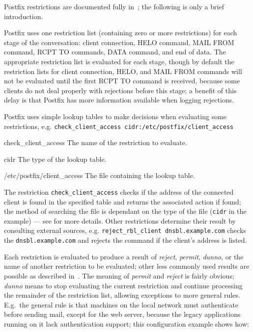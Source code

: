 \label{Mixing and matching Postfix restrictions}

Postfix restrictions are documented fully in~\cite{smtpd_access_readme,
smtpd_per_user_control, policy-servers}; the following is only a brief
introduction.

Postfix uses one restriction list (containing zero or more restrictions)
for each stage of the  conversation: client connection, HELO
command, MAIL FROM command, RCPT TO commands, DATA command, and end of
data.  The appropriate restriction list is evaluated for each stage, though
by default the restriction lists for client connection, HELO, and MAIL FROM
commands will not be evaluated until the first RCPT TO command is received,
because some clients do not deal properly with rejections before this
stage; a benefit of this delay is that Postfix has more information
available when logging rejections.

Postfix uses simple lookup tables to make decisions when evaluating some
restrictions, e.g.\newline{}
\tab{}\texttt{check\_client\_access~cidr:/etc/postfix/client\_access}

\begin{eqlist}

    \item [check\_client\_access] The name of the restriction to evaluate.

    \item [cidr] The type of the lookup table.

    \item [/etc/postfix/client\_access] The file containing the lookup
        table.

\end{eqlist}

The restriction \texttt{check\_client\_access} checks if the 
address of the connected client is found in the specified table and returns
the associated action if found; the method of searching the file is
dependant on the type of the file (\texttt{cidr} in the example) --- see
\cite{postfix-lookup-tables} for more details.  Other restrictions
determine their result by consulting external sources, e.g.\newline{}
\tab{}\texttt{reject\_rbl\_client dnsbl.example.com}\newline{} checks the
 \texttt{dnsbl.example.com} and rejects the command if the
client's  address is listed.

Each restriction is evaluated to produce a result of \textit{reject},
\textit{permit}, \textit{dunno}, or the name of another restriction to be
evaluated; other less commonly used results are possible as described
in~\cite{smtpd_access_readme,smtpd_per_user_control,policy-servers}.  The
meaning of \textit{permit\/} and \textit{reject\/} is fairly obvious;
\textit{dunno\/} means to stop evaluating the current restriction and
continue processing the remainder of the restriction list, allowing
exceptions to more general rules.  E.g.\ the general rule is that machines
on the local network must authenticate before sending mail, except for the
web server, because the legacy applications running on it lack
authentication support; this configuration example shows how:

